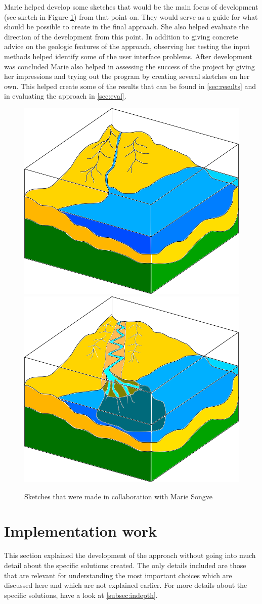 \documentclass[a4paper,12pt]{report}
\newcommand{\secref}[1]{\autoref{#1}}
\begin{document}
Marie helped develop some sketches that would be the main focus of development (see sketch in Figure \ref{fig:illuSketch}) from that point on. They would serve as a guide for what should be possible to create in the final approach. She also helped evaluate the direction of the development from this point. In addition to giving concrete advice on the geologic features of the approach, observing her testing the input methods helped identify some of the user interface problems. After development was concluded Marie also helped in assessing the success of the project by giving her impressions and trying out the program by creating several sketches on her own. This helped create some of the results that can be found in \secref{sec:results} and in evaluating the approach in \secref{sec:eval}. 

\begin{figure}
 \centering
\includegraphics[width=.4\linewidth]{thesis/illuSketch1.png}
\includegraphics[width=.4\linewidth]{thesis/illuSketch2.png}
 \caption{Sketches that were made in collaboration with Marie Songve}
 \label{fig:illuSketch}
\end{figure}

\section{Implementation work}

This section explained the development of the approach without going into much detail about the specific solutions created. The only details included are those that are relevant for understanding the most important choices which are discussed here and which are not explained earlier. For more details about the specific solutions, have a look at \secref{subsec:indepth}.
\end{document}
